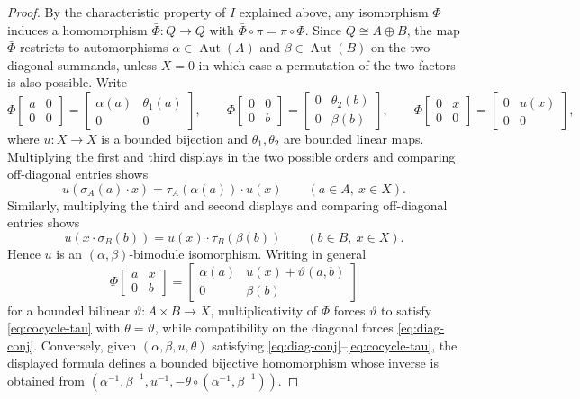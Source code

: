 \documentclass[10pt,a4paper]{amsart}
\newcommand{\Aut}{\operatorname{Aut}}
\begin{document}
\begin{proof}
By the characteristic property of \(I\) explained above, any isomorphism \(\Phi\) induces a homomorphism \(\bar\Phi:Q\to Q\) with \(\bar\Phi\circ\pi=\pi\circ\Phi\).
Since \(Q\cong A\oplus B\), the map \(\bar\Phi\) restricts to automorphisms \(\alpha\in\Aut(A)\) and \(\beta\in\Aut(B)\) on the two diagonal summands, unless \(X=0\) in which case a permutation of the two factors is also possible.
Write
\[
\Phi\!\begin{bmatrix}a&0\\[2pt]0&0\end{bmatrix}
=\begin{bmatrix}\alpha(a)&\theta_1(a)\\[2pt]0&0\end{bmatrix},
\qquad
\Phi\!\begin{bmatrix}0&0\\[2pt]0&b\end{bmatrix}
=\begin{bmatrix}0&\theta_2(b)\\[2pt]0&\beta(b)\end{bmatrix},
\qquad
\Phi\!\begin{bmatrix}0&x\\[2pt]0&0\end{bmatrix}
=\begin{bmatrix}0&u(x)\\[2pt]0&0\end{bmatrix},
\]
where \(u:X\to X\) is a bounded bijection and \(\theta_1,\theta_2\) are bounded linear maps.
Multiplying the first and third displays in the two possible orders and comparing off-diagonal entries shows
\[
u(\sigma_A(a)\cdot x)=\tau_A(\alpha(a))\cdot u(x)\qquad(a\in A,\ x\in X).
\]
Similarly, multiplying the third and second displays and comparing off-diagonal entries shows
\[
u(x\cdot \sigma_B(b))=u(x)\cdot \tau_B(\beta(b))\qquad(b\in B,\ x\in X).
\]
Hence \(u\) is an \((\alpha,\beta)\)-bimodule isomorphism.
Writing in general
\[
\Phi\!\begin{bmatrix}a&x\\[2pt]0&b\end{bmatrix}
=\begin{bmatrix}\alpha(a)&u(x)+\vartheta(a,b)\\[2pt]0&\beta(b)\end{bmatrix}
\]
for a bounded bilinear \(\vartheta:A\times B\to X\), multiplicativity of \(\Phi\) forces \(\vartheta\) to satisfy \eqref{eq:cocycle-tau} with \(\theta=\vartheta\), while compatibility on the diagonal forces \eqref{eq:diag-conj}.
Conversely, given \((\alpha,\beta,u,\theta)\) satisfying \eqref{eq:diag-conj}--\eqref{eq:cocycle-tau}, the displayed formula defines a bounded bijective homomorphism whose inverse is obtained from \((\alpha^{-1},\beta^{-1},u^{-1},-\theta\circ(\alpha^{-1},\beta^{-1}))\).
\end{proof}
\end{document}
